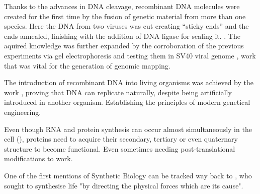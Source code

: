 Thanks to the advances in DNA cleavage, recombinant DNA molecules were created
for the first time by the fusion of genetic material from more than one species.
Here the DNA from two viruses was cut creating “sticky ends” and the ends
annealed, finishing with the addition of DNA ligase for sealing it.
\cite{jackson1972biochemical}. The aquired knowledge was further expanded by the
corroboration of the previous experiments via gel electrophoresis and testing
them in SV40 viral genome \cite{danna1971specific}, work that was vital for the
generation of genomic mapping.

The introduction of recombinant DNA into living organisms was achieved by the
work \cite{cohen1973construction}, proving that DNA can replicate naturally,
despite being artificially introduced in another organism. Establishing the
principles of modern genetical engineering.


Even though RNA and protein synthesis can occur almost simultaneously in the
cell (\cite{miller1970visualization}), proteins need to acquire their secondary,
tertiary or even quaternary structure to become functional. Even sometimes
needing post-translational modifications to work.  


One of the first mentions of Synthetic Biology can be tracked way back to
\cite{leduc1912biologie}, who sought to synthesise life "by directing the
physical forces which are its cause".


